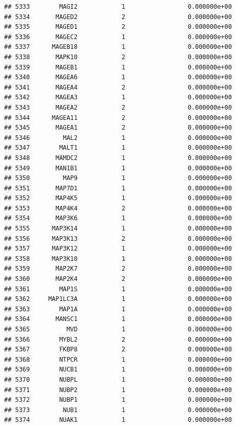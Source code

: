 \documentclass[
]{article}
\begin{document}
\begin{verbatim}
## 5333        MAGI2            1                 0.000000e+00
## 5334       MAGED2            2                 0.000000e+00
## 5335       MAGED1            2                 0.000000e+00
## 5336       MAGEC2            1                 0.000000e+00
## 5337      MAGEB18            1                 0.000000e+00
## 5338       MAPK10            2                 0.000000e+00
## 5339       MAGEB1            1                 0.000000e+00
## 5340       MAGEA6            1                 0.000000e+00
## 5341       MAGEA4            2                 0.000000e+00
## 5342       MAGEA3            1                 0.000000e+00
## 5343       MAGEA2            2                 0.000000e+00
## 5344      MAGEA11            2                 0.000000e+00
## 5345       MAGEA1            2                 0.000000e+00
## 5346         MAL2            1                 0.000000e+00
## 5347        MALT1            1                 0.000000e+00
## 5348       MAMDC2            1                 0.000000e+00
## 5349       MAN1B1            1                 0.000000e+00
## 5350         MAP9            1                 0.000000e+00
## 5351       MAP7D1            1                 0.000000e+00
## 5352       MAP4K5            1                 0.000000e+00
## 5353       MAP4K4            2                 0.000000e+00
## 5354       MAP3K6            1                 0.000000e+00
## 5355      MAP3K14            1                 0.000000e+00
## 5356      MAP3K13            2                 0.000000e+00
## 5357      MAP3K12            1                 0.000000e+00
## 5358      MAP3K10            1                 0.000000e+00
## 5359       MAP2K7            2                 0.000000e+00
## 5360       MAP2K4            2                 0.000000e+00
## 5361        MAP1S            1                 0.000000e+00
## 5362     MAP1LC3A            1                 0.000000e+00
## 5363        MAP1A            1                 0.000000e+00
## 5364       MANSC1            1                 0.000000e+00
## 5365          MVD            1                 0.000000e+00
## 5366        MYBL2            2                 0.000000e+00
## 5367        FKBP8            2                 0.000000e+00
## 5368        NTPCR            1                 0.000000e+00
## 5369        NUCB1            1                 0.000000e+00
## 5370        NUBPL            1                 0.000000e+00
## 5371        NUBP2            1                 0.000000e+00
## 5372        NUBP1            1                 0.000000e+00
## 5373         NUB1            1                 0.000000e+00
## 5374        NUAK1            1                 0.000000e+00

\end{verbatim}
\end{document}
